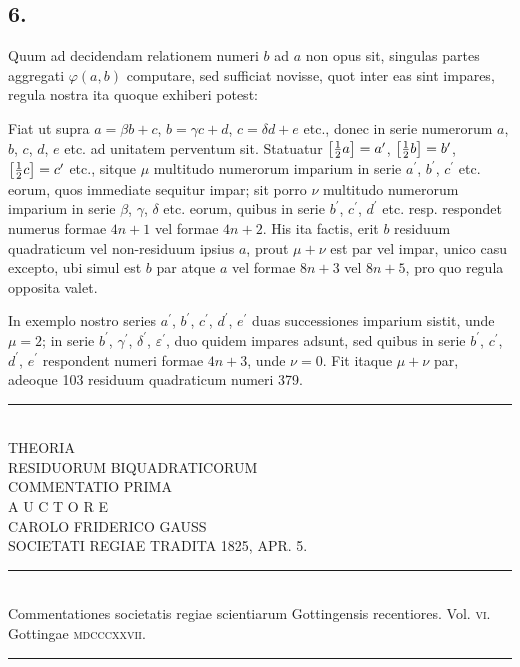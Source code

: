 \documentclass[twoside,12pt, showframe]{memoir}
\let\oldfrac\frac
\def\frac#1#2{\mathchoice{\tfrac{#1}{#2}}{\oldfrac{#1}{#2}}{\genfrac{}{}{}{2}{#1}{#2\mathstrut}}{\genfrac{}{}{}{3}{#1}{#2\mathstrut}}}
\begin{document}
\subsection*{6.}
 
Quum ad decidendam relationem numeri \(b\) ad \(a\) non opus sit, singulas partes aggregati \(\varphi(a, b)\) computare, sed sufficiat novisse, quot inter eas sint impares, regula nostra ita quoque exhiberi potest:
 
Fiat ut supra \(a=\beta b+c\), \(b=\gamma c+d\), \(c=\delta d+e\) etc., donec in serie numerorum \(a\), \(b\), \(c\), \(d\), \(e\) etc. ad unitatem perventum sit. Statuatur \(\left[\frac{1}{2} a\right]=a^{\prime}\), \(\left[\frac{1}{2} b\right]=b^{\prime}\), \(\left[\frac{1}{2} c\right]=c^{\prime}\) etc., sitque \(\mu\) multitudo numerorum imparium in serie \(a^{\prime}\), \(b^{\prime}\), \(c^{\prime}\) etc. eorum, quos immediate sequitur impar; sit porro \(\nu\) multitudo numerorum imparium in serie \(\beta\), \(\gamma\), \(\delta\) etc. eorum, quibus in serie \(b^{\prime}\), \(c^{\prime}\), \(d^{\prime}\) etc. resp. respondet numerus formae \(4 n+1\) vel formae \(4 n+2\). His ita factis, erit \(b\) residuum quadraticum vel non-residuum ipsius \(a\), prout \(\mu+\nu\) est par vel impar, unico casu excepto, ubi simul est \(b\) par atque \(a\) vel formae \(8 n+3\) vel \(8 n+5\), pro quo regula opposita valet.
 
In exemplo nostro series \(a^{\prime}\), \(b^{\prime}\), \(c^{\prime}\), \(d^{\prime}\), \(e^{\prime}\) duas successiones imparium sistit, unde \(\mu=2\); in serie \(b^{\prime}\), \(\gamma^{\prime}\), \(\delta^{\prime}\), \(\varepsilon^{\prime}\), duo quidem impares adsunt, sed quibus in serie \(b^{\prime}\), \(c^{\prime}\), \(d^{\prime}\), \(e^{\prime}\) respondent numeri formae \(4 n+3\), unde \(\nu=0\). Fit itaque \(\mu+\nu\) par, adeoque 103 residuum quadraticum numeri 379.\\[1.5\baselineskip]
\begin{center}\rule{1.5in}{0.5pt}\end{center}
\clearpage\noindent%

\begin{center}
\;\\[4\baselineskip]
{\large THEORIA  }\\[\baselineskip]
{\LARGE RESIDUORUM BIQUADRATICORUM }\\[3\baselineskip]
{\large COMMENTATIO PRIMA}\\[2.5\baselineskip]
{\tiny A U C T O R E}\\[1.5\baselineskip]
CAROLO FRIDERICO GAUSS\\[1.5\baselineskip]
{\scriptsize SOCIETATI REGIAE TRADITA {\tiny \textsc{1825},} APR. {\tiny \textsc{5}.}}\\[4\baselineskip]
\rule{4in}{0.5pt}\\[0.5\baselineskip]
{\small Commentationes societatis regiae scientiarum Gottingensis recentiores. Vol. \textsc{vi}.\\
Gottingae \textsc{mdcccxxvii}.}\\
\rule{4in}{0.5pt}
\end{center}
\clearpage\noindent%
\;
\clearpage\noindent%
\end{document}
